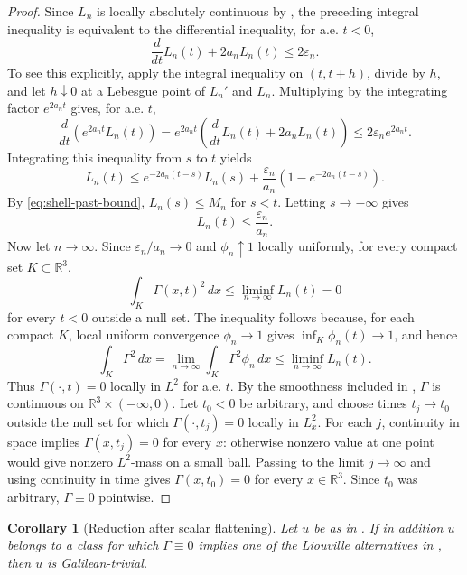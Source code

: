 \documentclass[11pt]{amsart}
\theoremstyle{plain}
\newtheorem{corollary}[theorem]{Corollary}
\theoremstyle{definition}
\theoremstyle{remark}
\numberwithin{equation}{section}
\begin{document}
\begin{proof}
Since \(L_n\) is locally absolutely continuous by , the
preceding integral inequality is equivalent to the differential inequality, for
a.e. \(t<0\),
\[
   \frac{d}{dt}L_n(t)+2a_nL_n(t)\le2\varepsilon_n .
\]
To see this explicitly, apply the integral inequality on \((t,t+h)\), divide
by \(h\), and let \(h\downarrow0\) at a Lebesgue point of \(L_n'\) and
\(L_n\).  Multiplying by the integrating factor \(e^{2a_nt}\) gives, for a.e.
\(t\),
\[
   \frac{d}{dt}\left(e^{2a_nt}L_n(t)\right)
   =
   e^{2a_nt}\left(\frac{d}{dt}L_n(t)+2a_nL_n(t)\right)
   \le
   2\varepsilon_n e^{2a_nt}.
\]
Integrating this inequality from \(s\) to \(t\) yields
\[
   L_n(t)
   \le
   e^{-2a_n(t-s)}L_n(s)
   +
   \frac{\varepsilon_n}{a_n}
   \left(1-e^{-2a_n(t-s)}\right).
\]
By \eqref{eq:shell-past-bound}, \(L_n(s)\le M_n\) for \(s<t\).  Letting
\(s\to-\infty\) gives
\[
   L_n(t)\le\frac{\varepsilon_n}{a_n}.
\]
Now let \(n\to\infty\).  Since \(\varepsilon_n/a_n\to0\) and
\(\phi_n\uparrow1\) locally uniformly, for every compact set
\(K\subset\mathbb R^3\),
\[
   \int_K\Gamma(x,t)^2\,dx
   \le
   \liminf_{n\to\infty}L_n(t)
   =
   0
\]
for every \(t<0\) outside a null set.  The inequality follows because, for
each compact \(K\), local uniform convergence \(\phi_n\to1\) gives
\(\inf_K\phi_n(t)\to1\), and hence
\[
   \int_K\Gamma^2\,dx
   =
   \lim_{n\to\infty}\int_K\Gamma^2\phi_n\,dx
   \le
   \liminf_{n\to\infty}L_n(t).
\]
Thus \(\Gamma(\cdot,t)=0\) locally in \(L^2\) for a.e. \(t\).  By the
smoothness included in , \(\Gamma\) is continuous on
\(\mathbb R^3\times(-\infty,0)\).  Let \(t_0<0\) be arbitrary, and choose
times \(t_j\to t_0\) outside the null set for which
\(\Gamma(\cdot,t_j)=0\) locally in \(L^2_x\).  For each \(j\), continuity in
space implies \(\Gamma(x,t_j)=0\) for every \(x\): otherwise nonzero value at
one point would give nonzero \(L^2\)-mass on a small ball.  Passing to the
limit \(j\to\infty\) and using continuity in time gives
\(\Gamma(x,t_0)=0\) for every \(x\in\mathbb R^3\).  Since \(t_0\) was
arbitrary, \(\Gamma\equiv0\) pointwise.
\end{proof}

\begin{corollary}[Reduction after scalar flattening]\label{cor:zero-gamma}
Let \(u\) be as in .  If in addition \(u\) belongs
to a class for which \(\Gamma\equiv0\) implies one of the Liouville
alternatives in , then \(u\) is Galilean-trivial.
\end{corollary}
\end{document}
